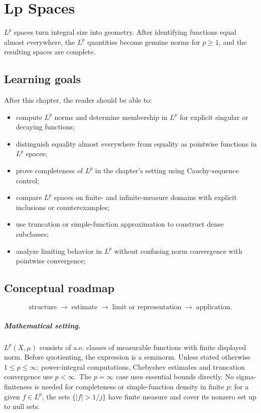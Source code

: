 \chapter{Lp Spaces}
\label{ch:iii06}

$L^p$ spaces turn integral size into geometry. After identifying functions equal almost everywhere, the $L^p$ quantities become genuine norms for $p\ge1$, and the resulting spaces are complete.

\section*{Learning goals}
After this chapter, the reader should be able to:
\begin{itemize}
\item compute \(L^p\) norms and determine membership in \(L^p\) for explicit singular or decaying functions;
\item distinguish equality almost everywhere from equality as pointwise functions in \(L^p\) spaces;
\item prove completeness of \(L^p\) in the chapter's setting using Cauchy-sequence control;
\item compare \(L^p\) spaces on finite- and infinite-measure domains with explicit inclusions or counterexamples;
\item use truncation or simple-function approximation to construct dense subclasses;
\item analyze limiting behavior in \(L^p\) without confusing norm convergence with pointwise convergence;
\end{itemize}
\section*{Conceptual roadmap}
\[
\boxed{\text{structure}\;\longrightarrow\;\text{estimate}\;\longrightarrow\;\text{limit or representation}\;\longrightarrow\;\text{application}.}
\]

\paragraph{Mathematical setting.}
$L^p(X,\mu)$ consists of a.e. classes of measurable functions with finite displayed norm. Before quotienting, the expression is a seminorm. Unless stated otherwise $1\le p\le\infty$; power-integral computations, Chebyshev estimates and truncation convergence use $p<\infty$. The $p=\infty$ case uses essential bounds directly. No sigma-finiteness is needed for completeness or simple-function density in finite $p$: for a given $f\in L^p$, the sets $\{|f|>1/j\}$ have finite measure and cover its nonzero set up to null sets.


